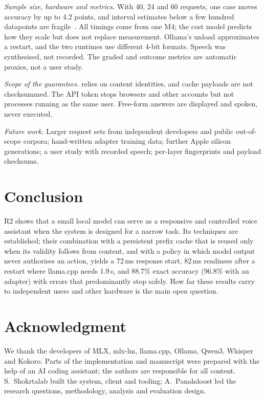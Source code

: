 \documentclass[journal]{IEEEtran}
\theoremstyle{definition}
\begin{document}
\emph{Sample size, hardware and metrics.} With 40, 24 and 60 requests, one case moves accuracy by
up to 4.2 points, and interval estimates below a few hundred datapoints are
fragile~\cite{bowyer2025clt}. All timings come from one M4; the cost model predicts how they scale
but does not replace measurement. Ollama's unload approximates a restart, and the two runtimes use
different 4-bit formats. Speech was synthesised, not recorded. The graded and outcome metrics are
automatic proxies, not a user study.

\emph{Scope of the guarantees.}  relies on content identities, and cache
payloads are not checksummed. The API token stops browsers and other accounts but not processes
running as the same user. Free-form answers are displayed and spoken, never executed.

\emph{Future work.} Larger request sets from independent developers and public out-of-scope
corpora; hand-written adapter training data; further Apple silicon generations; a user study with
recorded speech; per-layer fingerprints and payload checksums.

\section{Conclusion}

R2 shows that a small local model can serve as a responsive and controlled voice assistant when the
system is designed for a narrow task. Its techniques are established; their combination with a
persistent prefix cache that is reused only when its validity follows from content, and with a
policy in which model output never authorises an action, yields a 72\,ms response start, 82\,ms
readiness after a restart where llama.cpp needs 1.9\,s, and 88.7\% exact accuracy (96.8\% with an
adapter) with errors that predominantly stop safely. How far these results carry to independent
users and other hardware is the main open question.

\section*{Acknowledgment}
We thank the developers of MLX, mlx-lm, llama.cpp, Ollama, Qwen3, Whisper and Kokoro. Parts of the
implementation and manuscript were prepared with the help of an AI coding assistant; the authors are
responsible for all content. S.~Shokrtalab built the system, client and tooling; A.~Panahdoost led
the research questions, methodology, analysis and evaluation design.
\end{document}
